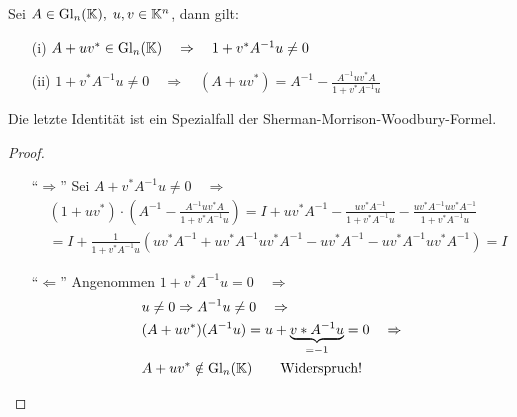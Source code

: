 \begin{Lemma}
Sei $A \in \mathrm{Gl}_n(\mathbb K), \; u, v \in \mathbb K^n$, dann gilt:
  \begin{enumerate}
    \item[(i)] $A + u  v^* \in \mathrm{Gl}_n(\mathbb K) \quad \Rightarrow \quad 1 + v^* A^{-1} u \ne 0$
    \item[(ii)] $1 + v^* A^{-1} u \ne 0  \quad \Rightarrow \quad
      (A + uv^*) = A^{-1} - \frac{A^{-1} u v^* A}{1 + v^*A^{-1}u}$
  \end{enumerate}
Die letzte Identität ist ein Spezialfall der Sherman-Morrison-Woodbury-Formel.
\end{Lemma}
\begin{proof}
\quad \\
  \begin{enumerate}
    \item["`$\Rightarrow$"'] Sei $A + v^* A^{-1} u \ne 0 \quad \Rightarrow $
    \begin{align*}
    & (1 + u v^*)\cdot \left(A^{-1} - \frac{A^{-1} u v^* A}{1 + v^*A^{-1}u}  \right) =
    I + u v^*A^{-1} - \frac{u v^* A^{-1}}{1 + v^*A^{-1} u} -
       \frac{u v^* A^{-1}u v^* A^{-1}}{1 +  v^*A^{-1} u} \\
    & = I + \frac{1}{1 + v^*A^{-1}u} \left( u v^* A^{-1} + u v^* A^{-1} u v^* A^{-1} -
      u v^* A^{-1} - u v^* A^{-1} u v^* A^{-1} \right) = I
    \end{align*}

    \item["`$\Leftarrow$"'] Angenommen $1 + v^* A^{-1} u = 0 \quad \Rightarrow $
    \begin{align*}
      & u \ne 0 \Rightarrow A^{-1} u \ne 0 \quad \Rightarrow \\
      & (A + u v^*) (A^{-1} u) = u + \underbrace{v* A^{-1} u}_{= -1} = 0 \quad \Rightarrow \\
     &  A + u v^* \notin \mathrm{Gl}_n(\mathbb K) \qquad \text{Widerspruch!}
    \end{align*}
  \end{enumerate}
\end{proof}
